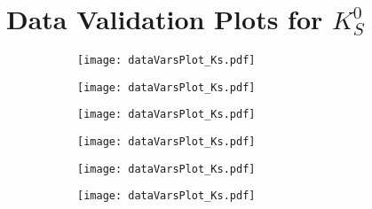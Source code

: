 \chapter{Data Validation Plots for $K_S^0$}

\begin{figure}[H]
\caption{The distribution of the training variables in KsFinder. The blue and purple solid lines are the total and true $K_S^0$ distributions from generic MC, respectively. The yellow and red dots are the data distribution before and after applying KsFinder cut. The uncertainties in data are taken as three times the Poisson standard deviation.}
\begin{subfigure}{0.5\linewidth}
\texttt{[image: dataVarsPlot\_Ks.pdf]}
\end{subfigure}
\begin{subfigure}{0.5\linewidth}
\texttt{[image: dataVarsPlot\_Ks.pdf]}
\end{subfigure}
\begin{subfigure}{0.5\linewidth}
\texttt{[image: dataVarsPlot\_Ks.pdf]}
\end{subfigure}
\begin{subfigure}{0.5\linewidth}
\texttt{[image: dataVarsPlot\_Ks.pdf]}
\end{subfigure}
\begin{subfigure}{0.5\linewidth}
\texttt{[image: dataVarsPlot\_Ks.pdf]}
\end{subfigure}
\begin{subfigure}{0.5\linewidth}
\texttt{[image: dataVarsPlot\_Ks.pdf]}
\end{subfigure}
\end{figure}

